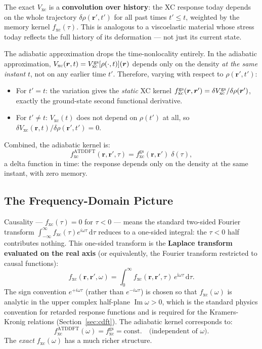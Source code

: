 \documentclass[12pt,letterpaper]{article}
\newcommand{\dd}{\mathrm{d}}
\newcommand{\ii}{\mathrm{i}}
\newcommand{\Vxc}{V_{\mathrm{xc}}}
\newcommand{\fxc}{f_{\mathrm{xc}}}
\theoremstyle{definition}
\begin{document}
\begin{insight}
The exact $\Vxc$ is a \textbf{convolution over history}: the XC
response today depends on the whole trajectory $\delta\rho(\bm{r}',t')$
for all past times $t'\leq t$, weighted by the memory kernel
$\fxc(\tau)$.  This is analogous to a viscoelastic material whose
stress today reflects the full history of its deformation --- not just
its current state.
\end{insight}

The adiabatic approximation drops the time-nonlocality entirely.
In the adiabatic approximation, $V_\text{xc}(\bm{r},t) = V_\text{xc}^{\rm gs}[\rho(\cdot,t)](\bm{r})$
depends only on the density \emph{at the same instant} $t$, not on any
earlier time $t'$.
Therefore, varying with respect to $\rho(\bm{r}',t')$:
\begin{itemize}[noitemsep]
  \item For $t' = t$: the variation gives the \emph{static} XC kernel
    $\fxc^{\rm gs}(\bm{r},\bm{r}') = \delta V_\text{xc}^{\rm gs}/\delta\rho(\bm{r}')$,
    exactly the ground-state second functional derivative.
  \item For $t' \neq t$: $V_\text{xc}(t)$ does not depend on $\rho(t')$
    at all, so $\delta V_\text{xc}(\bm{r},t)/\delta\rho(\bm{r}',t') = 0$.
\end{itemize}
Combined, the adiabatic kernel is:
\begin{equation}
  \fxc^{\mathrm{ATDDFT}}(\bm{r},\bm{r}',\tau)
  = \fxc^{\mathrm{gs}}(\bm{r},\bm{r}')\;\delta(\tau),
  \label{eq:fxc_adiab}
\end{equation}
a delta function in time: the response depends only on the density
at the same instant, with zero memory.

\subsection{The Frequency-Domain Picture}

Causality — $\fxc(\tau) = 0$ for $\tau < 0$ — means the standard
two-sided Fourier transform $\int_{-\infty}^{\infty}\fxc(\tau)e^{i\omega\tau}\,\dd\tau$
reduces to a one-sided integral: the $\tau<0$ half contributes nothing.
This one-sided transform is the \textbf{Laplace transform evaluated on
the real axis} (or equivalently, the Fourier transform restricted to
causal functions):
\begin{equation}
  \fxc(\bm{r},\bm{r}',\omega)
  = \int_0^\infty\!\fxc(\bm{r},\bm{r}',\tau)\,e^{\ii\omega\tau}\,\dd\tau.
  \label{eq:fxc_fourier}
\end{equation}
The sign convention $e^{+i\omega\tau}$ (rather than $e^{-i\omega\tau}$)
is chosen so that $\fxc(\omega)$ is analytic in the upper complex
half-plane $\operatorname{Im}\omega > 0$, which is the standard
physics convention for retarded response functions and is required for
the Kramers-Kronig relations (Section~\ref{sec:cdft}).
The adiabatic kernel corresponds to:
\begin{equation}
  \fxc^{\mathrm{ATDDFT}}(\omega) = \fxc^{\mathrm{gs}} = \text{const.}
  \quad\text{(independent of }\omega\text{)}.
  \label{eq:fxc_static}
\end{equation}
The \emph{exact} $\fxc(\omega)$ has a much richer structure.
\end{document}
